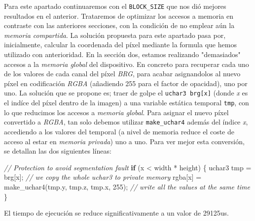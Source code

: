 \documentclass[
]{article}
\newenvironment{Shaded}{}{}
\newcommand{\CommentTok}[1]{\textcolor[rgb]{0.38,0.63,0.69}{\textit{#1}}}
\newcommand{\ControlFlowTok}[1]{\textcolor[rgb]{0.00,0.44,0.13}{\textbf{#1}}}
\newcommand{\DecValTok}[1]{\textcolor[rgb]{0.25,0.63,0.44}{#1}}
\newcommand{\NormalTok}[1]{#1}
\newcommand{\OperatorTok}[1]{\textcolor[rgb]{0.40,0.40,0.40}{#1}}
\begin{document}
Para este apartado continuaremos con el \texttt{BLOCK\_SIZE} que nos dió
mejores resultados en el anterior. Trataremos de optimizar los accesos a
memoria en contraste con las anteriores secciones, con la condición de
no emplear aún la \emph{memoria compartida}. La solución propuesta para
este apartado pasa por, inicialmente, calcular la coordenada del píxel
mediante la formula que hemos utilizado con anterioridad. En la sección
dos, estamos realizando "demasiados" accesos a la \emph{memoria global}
del dispositivo. En concreto para recuperar cada uno de los valores de
cada canal del píxel \emph{BRG}, para acabar asignandolos al nuevo píxel
en codificación \emph{RGBA} (añadiendo 255 para el factor de opacidad),
uno por uno. La solución que se propone es; traer de golpe el
\texttt{uchar3\ brg{[}x{]}} (donde \emph{x} es el indíce del píxel
dentro de la imagen) a una variable estática temporal \texttt{tmp}, con
lo que reducimos los accesos a \emph{memoria global}. Para asignar el
nuevo píxel convertido a \emph{RGBA}, tan solo debemos utilizar
\texttt{make\_uchar4} además del índice \emph{x}, accediendo a los
valores del temporal (a nivel de memoria reduce el coste de acceso al
estar en \emph{memoria privada}) uno a uno. Para ver mejor esta
conversión, se detallan las dos siguientes líneas:

\begin{Shaded}
\begin{Highlighting}[]
	\CommentTok{// Protection to avoid segmentation fault}
	\ControlFlowTok{if} \OperatorTok{(}\NormalTok{x }\OperatorTok{\textless{}}\NormalTok{ width }\OperatorTok{*}\NormalTok{ height}\OperatorTok{)} \OperatorTok{\{}
\NormalTok{      uchar3 tmp }\OperatorTok{=}\NormalTok{ brg}\OperatorTok{[}\NormalTok{x}\OperatorTok{];} \CommentTok{// we copy the whole uchar3 to private memory }
\NormalTok{      rgba}\OperatorTok{[}\NormalTok{x}\OperatorTok{]} \OperatorTok{=}\NormalTok{ make\_uchar4}\OperatorTok{(}\NormalTok{tmp}\OperatorTok{.}\NormalTok{y}\OperatorTok{,}\NormalTok{ tmp}\OperatorTok{.}\NormalTok{z}\OperatorTok{,}\NormalTok{ tmp}\OperatorTok{.}\NormalTok{x}\OperatorTok{,} \DecValTok{255}\OperatorTok{);} \CommentTok{// write all the values at the same time}
	\OperatorTok{\}}
\end{Highlighting}
\end{Shaded}

El tiempo de ejecución se reduce significativamente a un valor de
29125us.
\end{document}
